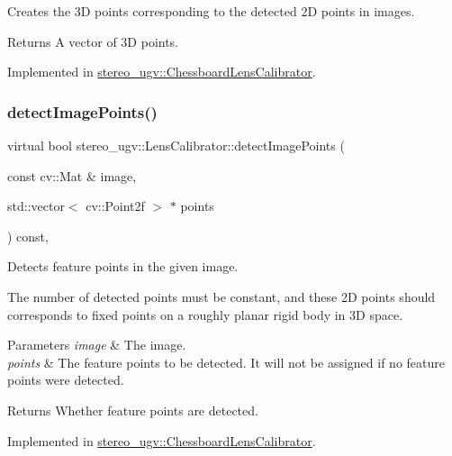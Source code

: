 Creates the 3D points corresponding to the detected 2D points in images. 

\begin{DoxyReturn}{Returns}
A vector of 3D points. 
\end{DoxyReturn}


Implemented in \hyperlink{classstereo__ugv_1_1ChessboardLensCalibrator_adaeaa9e0a3203872ea8e5ef5b3482f7e}{stereo\+\_\+ugv\+::\+Chessboard\+Lens\+Calibrator}.

\mbox{\label{classstereo__ugv_1_1LensCalibrator_a9be834b0ef2983af47ac5f9dd67887fe}} 
\subsubsection{\texorpdfstring{detect\+Image\+Points()}{detectImagePoints()}}
{\footnotesize\ttfamily virtual bool stereo\+\_\+ugv\+::\+Lens\+Calibrator\+::detect\+Image\+Points (\begin{DoxyParamCaption}\item[{const cv\+::\+Mat \&}]{image,  }\item[{std\+::vector$<$ cv\+::\+Point2f $>$ $\ast$}]{points }\end{DoxyParamCaption}) const\hspace{0.3cm}{\ttfamily [protected]}, {}}



Detects feature points in the given image. 

The number of detected points must be constant, and these 2D points should corresponds to fixed points on a roughly planar rigid body in 3D space. 
\begin{DoxyParams}{Parameters}
{\em image} & The image. \\
\hline
{\em points} & The feature points to be detected. It will not be assigned if no feature points were detected. \\
\hline
\end{DoxyParams}
\begin{DoxyReturn}{Returns}
Whether feature points are detected. 
\end{DoxyReturn}


Implemented in \hyperlink{classstereo__ugv_1_1ChessboardLensCalibrator_ac6e93519a72d4218bcb1f9a49a9c22eb}{stereo\+\_\+ugv\+::\+Chessboard\+Lens\+Calibrator}.

